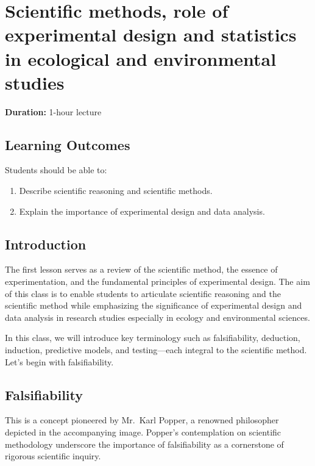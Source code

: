 \documentclass[
]{book}
\providecommand{\tightlist}{%
  \setlength{\itemsep}{0pt}\setlength{\parskip}{0pt}}
\begin{document}
\chapter{Scientific methods, role of experimental design and statistics in ecological and environmental studies}\label{scientific-methods}

\textbf{Duration:} 1-hour lecture

\section{Learning Outcomes}\label{learning-outcomes}

Students should be able to:

\begin{enumerate}
\def\labelenumi{\arabic{enumi}.}
\tightlist
\item
  Describe scientific reasoning and scientific methods.
\item
  Explain the importance of experimental design and data analysis.
\end{enumerate}

\section{Introduction}\label{introduction}

The first lesson serves as a review of the scientific method, the essence of experimentation, and the fundamental principles of experimental design. The aim of this class is to enable students to articulate scientific reasoning and the scientific method while emphasizing the significance of experimental design and data analysis in research studies especially in ecology and environmental sciences.

In this class, we will introduce key terminology such as falsifiability, deduction, induction, predictive models, and testing---each integral to the scientific method. Let's begin with falsifiability.

\section{Falsifiability}\label{falsifiability}

This is a concept pioneered by Mr.~Karl Popper, a renowned philosopher depicted in the accompanying image. Popper's contemplation on scientific methodology underscore the importance of falsifiability as a cornerstone of rigorous scientific inquiry.
\end{document}
